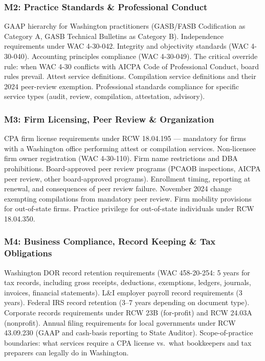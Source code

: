 \documentclass[11pt,letterpaper]{article}
\begin{document}
\subsubsection{M2: Practice Standards \& Professional Conduct}
GAAP hierarchy for Washington practitioners (GASB/FASB Codification as Category A, GASB Technical Bulletins as Category B). Independence requirements under WAC 4-30-042. Integrity and objectivity standards (WAC 4-30-040). Accounting principles compliance (WAC 4-30-049). The critical override rule: when WAC 4-30 conflicts with AICPA Code of Professional Conduct, board rules prevail. Attest service definitions. Compilation service definitions and their 2024 peer-review exemption. Professional standards compliance for specific service types (audit, review, compilation, attestation, advisory).

\subsubsection{M3: Firm Licensing, Peer Review \& Organization}
CPA firm license requirements under RCW 18.04.195 --- mandatory for firms with a Washington office performing attest or compilation services. Non-licensee firm owner registration (WAC 4-30-110). Firm name restrictions and DBA prohibitions. Board-approved peer review programs (PCAOB inspections, AICPA peer review, other board-approved programs). Enrollment timing, reporting at renewal, and consequences of peer review failure. November 2024 change exempting compilations from mandatory peer review. Firm mobility provisions for out-of-state firms. Practice privilege for out-of-state individuals under RCW 18.04.350.

\subsubsection{M4: Business Compliance, Record Keeping \& Tax Obligations}
Washington DOR record retention requirements (WAC 458-20-254: 5 years for tax records, including gross receipts, deductions, exemptions, ledgers, journals, invoices, financial statements). L\&I employer payroll record requirements (3 years). Federal IRS record retention (3--7 years depending on document type). Corporate records requirements under RCW 23B (for-profit) and RCW 24.03A (nonprofit). Annual filing requirements for local governments under RCW 43.09.230 (GAAP and cash-basis reporting to State Auditor). Scope-of-practice boundaries: what services require a CPA license vs.\ what bookkeepers and tax preparers can legally do in Washington.
\end{document}
